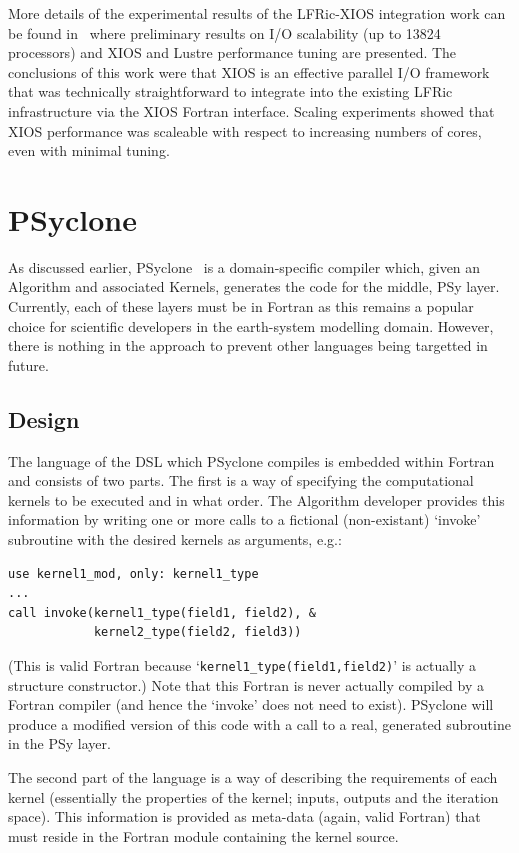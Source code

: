 \documentclass[times]{elsarticle}
\begin{document}
More details of the experimental results of the LFRic-XIOS integration work can be
found in~\cite{Adams2018} where preliminary results on I/O scalability (up to 13824 
processors) and XIOS and Lustre performance tuning are presented. The conclusions of
this work were that XIOS is an effective parallel I/O framework that was technically
straightforward to integrate into the existing LFRic infrastructure via the XIOS
Fortran interface. Scaling experiments showed that XIOS performance was scaleable with
respect to increasing numbers of cores, even with minimal tuning.

\section{\label{sec:psyclone}PSyclone}

As discussed earlier, PSyclone~\cite{psyclone} is a domain-specific
compiler which, given an Algorithm and associated Kernels, generates
the code for the middle, PSy layer. Currently, each of these layers
must be in Fortran as this remains a popular choice for scientific
developers in the earth-system modelling domain. However, there is
nothing in the approach to prevent other languages being targetted in
future.

\subsection{Design}

The language of the DSL which PSyclone compiles is embedded within
Fortran and consists of two parts. The first is a way of specifying
the computational kernels to be executed and in what order.  The
Algorithm developer provides this information by writing one or more
calls to a fictional (non-existant) `invoke' subroutine with the
desired kernels as arguments, e.g.:
\begin{lstlisting}
use kernel1_mod, only: kernel1_type
...
call invoke(kernel1_type(field1, field2), &
            kernel2_type(field2, field3))
\end{lstlisting}
(This is valid Fortran because `\lstinline!kernel1_type(field1,field2)!' is
actually a structure constructor.) Note that this Fortran
is never actually compiled by a Fortran compiler (and hence the `invoke'
does not need to exist). PSyclone will produce a modified version of this
code with a call to a real, generated subroutine in the PSy layer.

The second part of the language is a way of describing the
requirements of each kernel (essentially the properties of the kernel;
inputs, outputs and the iteration space). This information is
provided as meta-data (again, valid Fortran) that must reside in the
Fortran module containing the kernel source.
\end{document}
